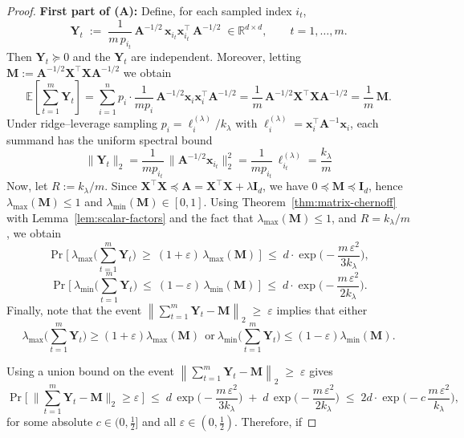 \documentclass{article}
\def\amat{\mathbf{A}}
\def\xmat{\mathbf{X}}
\def\imat{\mathbf{I}}
\def\x{\mathbf{x}}
\newcommand{\1}{\mathbbm{1}}
\begin{document}
\begin{proof}

    \noindent\textbf{First part of (A):}
Define, for each sampled index $i_t$,
\[
\mathbf{Y}_t \;:=\; \frac{1}{m\,p_{i_t}}\,\amat^{-1/2}\,\x_{i_t}\x_{i_t}^\top\,\amat^{-1/2}\;\in\mathbb{R}^{d\times d},
\qquad t=1,\dots,m.
\]
    Then $\mathbf{Y}_t\succeq 0$ and the $\mathbf{Y}_t$ are independent. Moreover, letting $\mathbf{M}:= \amat^{-1/2}\xmat^\top \xmat \amat^{-1/2}$ we obtain
\[
\mathbb{E}\!\left[\sum_{t=1}^m \mathbf{Y}_t\right]
= \sum_{i=1}^n p_i\cdot \frac{1}{m p_i}\,\amat^{-1/2}\x_i\x_i^\top\amat^{-1/2}
= \frac{1}{m}\,\amat^{-1/2}\xmat^\top \xmat \amat^{-1/2}
= \frac{1}{m}\,\mathbf{M}.
\]
Under ridge–leverage sampling $p_i=\ell_i^{(\lambda)}/k_\lambda$ with $\ell_i^{(\lambda)}=\x_i^\top\amat^{-1}\x_i$, each summand has the uniform spectral bound
\[
\|\mathbf{Y}_t\|_2
= \frac{1}{m p_{i_t}}\,\|\amat^{-1/2}\x_{i_t}\|_2^2
= \frac{1}{m p_{i_t}}\,\ell^{(\lambda)}_{i_t}
= \frac{k_\lambda}{m}
\]
Now, let $R:= k_\lambda/m$. Since $\xmat^\top\xmat\preceq \amat=\xmat^\top\xmat+\lambda\imat_d$, we have $0\preceq \mathbf{M}\preceq \mathbf{I}_d$, hence $\lambda_{\max}(\mathbf{M})\le 1$ and $\lambda_{\min}(\mathbf{M})\in[0,1]$.
%
    Using Theorem~\ref{thm:matrix-chernoff} with Lemma~\ref{lem:scalar-factors} and the fact that $\lambda_{\max}(\mathbf{M})\le 1$, and $R=k_\lambda/m$, we obtain
\[
\Pr\!\Big[\ \lambda_{\max}\!\Big(\sum_{t=1}^m \mathbf{Y}_t\Big)\ \ge\ (1+\varepsilon)\,\lambda_{\max}(\mathbf{M})\ \Big]
\;\le\; d\cdot \exp\!\Big(-\frac{m\,\varepsilon^2}{3k_\lambda}\Big),
\]
\[
\Pr\!\Big[\ \lambda_{\min}\!\Big(\sum_{t=1}^m \mathbf{Y}_t\Big)\ \le\ (1-\varepsilon)\,\lambda_{\min}(\mathbf{M})\ \Big]
\;\le\; d\cdot \exp\!\Big(-\frac{m\,\varepsilon^2}{2k_\lambda}\Big).
\]
Finally, note that the event $\left\|\textstyle\sum_{t=1}^m \mathbf{Y}_t - \mathbf{M}\right\|_2
\;\ge\; \varepsilon$ implies that either 
%
\[
\lambda_{\max}\!\Big(\textstyle\sum_{t=1}^m \mathbf{Y}_t\Big) \ge (1+\varepsilon)\lambda_{\max}(\mathbf{M})
\ \ \text{or}\
\lambda_{\min}\!\Big(\textstyle\sum_{t=1}^m \mathbf{Y}_t\Big) \le (1-\varepsilon)\lambda_{\min}(\mathbf{M}).
\]

Using a union bound on the event $\left\|\textstyle\sum_{t=1}^m \mathbf{Y}_t - \mathbf{M}\right\|_2
\;\ge\; \varepsilon$ gives 
%
\[
\Pr\!\Big[\ \big\|\textstyle\sum_{t=1}^m \mathbf{Y}_t - \mathbf{M}\big\|_2 \ge \varepsilon \ \Big]
\;\le\; d\,\exp\!\Big(-\frac{m\,\varepsilon^2}{3k_\lambda}\Big)\;+\; d\,\exp\!\Big(-\frac{m\,\varepsilon^2}{2k_\lambda}\Big)
\;\le\; 2d\cdot \exp\!\Big(-c\,\frac{m\,\varepsilon^2}{k_\lambda}\Big),
\]
for some absolute $c\in(0,\tfrac12]$ and all $\varepsilon\in(0,\tfrac12)$.
%
Therefore, if


\end{proof}
\end{document}
